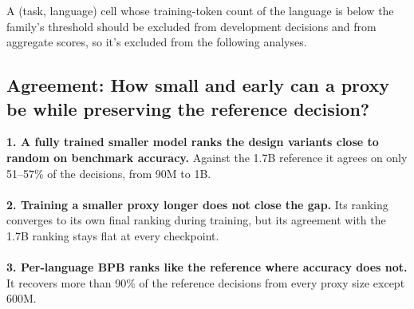 A (task, language) cell whose training-token count of the language is below the family's threshold should be excluded from development decisions and from aggregate scores, so it's excluded from the following analyses. %


\subsection{Agreement: How small and early can a proxy be while preserving the reference decision?}
\label{subsec:rq2}

\begin{rqfinding}
\textbf{1. A fully trained smaller model ranks the design variants close to random on benchmark accuracy.} Against the 1.7B reference it agrees on only 51--57\% of the decisions, from 90M to 1B.
\\
\\
\textbf{2. Training a smaller proxy longer does not close the gap.} Its ranking converges to its own final ranking during training, but its agreement with the 1.7B ranking stays flat at every checkpoint.
\\
\\
\textbf{3. Per-language BPB ranks like the reference where accuracy does not.} It recovers more than 90\% of the reference decisions from every proxy size except 600M.
\end{rqfinding}

